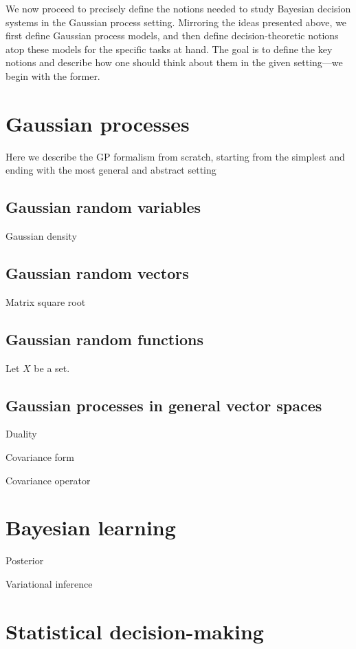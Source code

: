 \documentclass[11pt]{book}
\begin{document}
We now proceed to precisely define the notions needed to study Bayesian decision systems in the Gaussian process setting.
Mirroring the ideas presented above, we first define Gaussian process models, and then define decision-theoretic notions atop these models for the specific tasks at hand.
The goal is to define the key notions and describe how one should think about them in the given setting---we begin with the former.

\section{Gaussian processes}

Here we describe the GP formalism from scratch, starting from the simplest and ending with the most general and abstract setting

\subsection{Gaussian random variables}

Gaussian density

\subsection{Gaussian random vectors}

Matrix square root

\subsection{Gaussian random functions}

Let $X$ be a set. 

\subsection{Gaussian processes in general vector spaces}

Duality

Covariance form

Covariance operator

\section{Bayesian learning}

Posterior

Variational inference

\section{Statistical decision-making}
\end{document}
